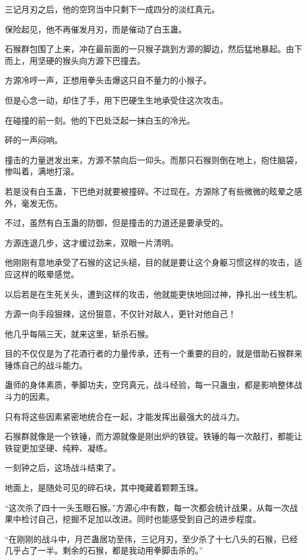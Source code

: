 \begin{this_body}
三记月刃之后，他的空窍当中只剩下一成四分的淡红真元。

保险起见，他不再催发月刃，而是催动了白玉蛊。

石猴群包围了上来，冲在最前面的一只猴子跳到方源的脚边，然后猛地暴起。由下而上，用坚硬的猴头向方源下巴撞去。

方源冷哼一声，正想用拳头击爆这只自不量力的小猴子。

但是心念一动，却住了手，用下巴硬生生地承受住这次攻击。

在碰撞的前一刻。他的下巴处泛起一抹白玉的冷光。

砰的一声闷响。

撞击的力量迸发出来，方源不禁向后一仰头。而那只石猴则倒在地上，抱住脑袋，惨叫着，满地打滚。

若是没有白玉蛊，下巴绝对就要被撞碎。不过现在。方源除了有些微微的眩晕之感外，毫发无伤。

不过，虽然有白玉蛊的防御，但是撞击的力道还是要承受的。

方源连退几步，这才缓过劲来，双眼一片清明。

他刚刚有意地承受了石猴的这记头槌，目的就是要让这个身躯习惯这样的攻击，适应这样的眩晕感觉。

以后若是在生死关头，遭到这样的攻击，他就能更快地回过神，挣扎出一线生机。

方源一向手段狠辣，这份狠意，不仅针对敌人，更针对他自己！

他几乎每隔三天，就来这里，斩杀石猴。

目的不仅仅是为了花酒行者的力量传承，还有一个重要的目的，就是借助石猴群来锤炼自己的战斗能力。

蛊师的身体素质，拳脚功夫，空窍真元，战斗经验，每一只蛊虫，都是影响整体战斗力的因素。

只有将这些因素紧密地统合在一起，才能发挥出最强大的战斗力。

石猴群就像是一个铁锤，而方源就像是刚出炉的铁锭。铁锤的每一次敲打，都能让铁锭更加坚硬、纯粹、凝练。

一刻钟之后，这场战斗结束了。

地面上，是随处可见的碎石块，其中掩藏着颗颗玉珠。

“这次杀了四十一头玉眼石猴。”方源心中有数，每一次都会统计战果，从每一次战果中检讨自己，挖掘不足加以改进。同时也能感受到自己的进步程度。

“在刚刚的战斗中，月芒蛊居功至伟，三记月刃，至少杀了十七八头的石猴，已经几乎占了一半。剩余的石猴，都是我动用拳脚击杀的。”


\end{this_body}
